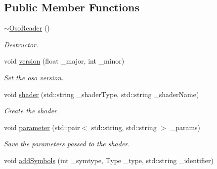\subsection*{Public Member Functions}
\begin{DoxyCompactItemize}
\item 
\hypertarget{class_oso_reader_a7c250441e714b1ed213dc390f941fab7}{\hyperlink{class_oso_reader_a7c250441e714b1ed213dc390f941fab7}{$\sim$\-Oso\-Reader} ()}\label{class_oso_reader_a7c250441e714b1ed213dc390f941fab7}

\begin{DoxyCompactList}\small\item\em Destructor. \end{DoxyCompactList}\item 
\hypertarget{class_oso_reader_a35a37d1eaf5c997542f9002420c6bbe7}{void \hyperlink{class_oso_reader_a35a37d1eaf5c997542f9002420c6bbe7}{version} (float \-\_\-major, int \-\_\-minor)}\label{class_oso_reader_a35a37d1eaf5c997542f9002420c6bbe7}

\begin{DoxyCompactList}\small\item\em Set the oso version. \end{DoxyCompactList}\item 
\hypertarget{class_oso_reader_adf00a6dc6731f40bbac2934d8c648bf6}{void \hyperlink{class_oso_reader_adf00a6dc6731f40bbac2934d8c648bf6}{shader} (std\-::string \-\_\-shader\-Type, std\-::string \-\_\-shader\-Name)}\label{class_oso_reader_adf00a6dc6731f40bbac2934d8c648bf6}

\begin{DoxyCompactList}\small\item\em Create the shader. \end{DoxyCompactList}\item 
\hypertarget{class_oso_reader_aa4df700268fcad6da25a4d6b7c7c2049}{void \hyperlink{class_oso_reader_aa4df700268fcad6da25a4d6b7c7c2049}{parameter} (std\-::pair$<$ std\-::string, std\-::string $>$ \-\_\-params)}\label{class_oso_reader_aa4df700268fcad6da25a4d6b7c7c2049}

\begin{DoxyCompactList}\small\item\em Save the parameters passed to the shader. \end{DoxyCompactList}\item 
\hypertarget{class_oso_reader_a4587ad9c490317097956bb82c8b69ecb}{void \hyperlink{class_oso_reader_a4587ad9c490317097956bb82c8b69ecb}{add\-Symbols} (int \-\_\-symtype, Type \-\_\-type, std\-::string \-\_\-identifier)}\label{class_oso_reader_a4587ad9c490317097956bb82c8b69ecb}


\end{DoxyCompactItemize}
